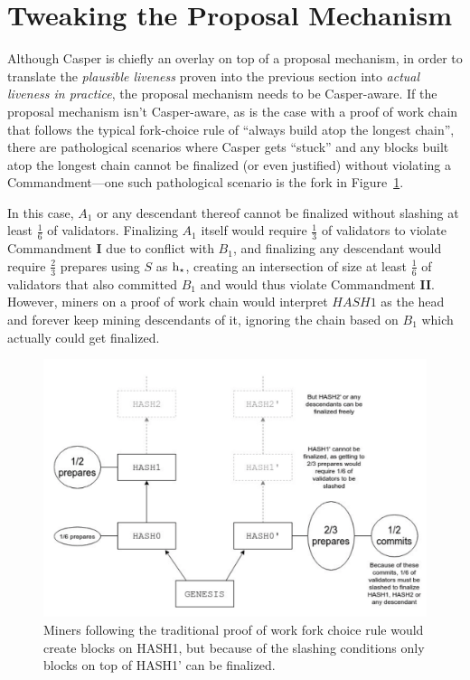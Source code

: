 \documentclass[12pt, final]{article}
\newcommand{\figref}[1]{Figure~\ref{#1}}
\newcommand{\hash}{\textnormal{h}\space}
\newcommand{\hashsource}{\ensuremath{\hash_{\star}}\space}
\begin{document}
\section{Tweaking the Proposal Mechanism}
\label{sect:forkchoice}

Although Casper is chiefly an overlay on top of a proposal mechanism, in order to translate the \textit{plausible liveness} proven into the previous section into \textit{actual liveness in practice}, the proposal mechanism needs to be Casper-aware.  If the proposal mechanism isn't Casper-aware, as is the case with a proof of work chain that follows the typical fork-choice rule of ``always build atop the longest chain'', there are pathological scenarios where Casper gets ``stuck'' and any blocks built atop the longest chain cannot be finalized (or even justified) without violating a Commandment---one such pathological scenario is the fork in \figref{fig:forkchoice}.

In this case, $A_1$ or any descendant thereof cannot be finalized without slashing at least $\frac{1}{6}$ of validators. Finalizing $A_1$ itself would require $\frac{1}{3}$ of validators to violate Commandment \textbf{I} due to conflict with $B_1$, and finalizing any descendant would require $\frac{2}{3}$ prepares using $S$ as \hashsource, creating an intersection of size at least $\frac{1}{6}$ of validators that also committed $B_1$ and would thus violate Commandment \textbf{II}. However, miners on a proof of work chain would interpret $HASH1$ as the head and forever keep mining descendants of it, ignoring the chain based on $B_1$ which actually could get finalized.

\begin{figure}[h!tb]
\centering
\includegraphics[width=5.5in]{fork4.png}
\caption{Miners following the traditional proof of work fork choice rule would create blocks on HASH1, but because of the slashing conditions only blocks on top of HASH1' can be finalized.}
\label{fig:forkchoice}
\end{figure}
\end{document}
